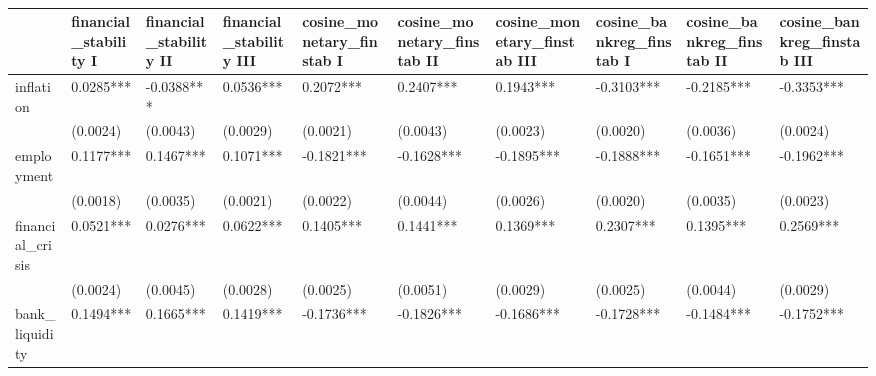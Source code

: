\begin{table}
\caption{}
\label{}
\begin{center}
\begin{tabular}{llllllllll}
\hline
                         & financial\_stability I & financial\_stability II & financial\_stability III & cosine\_monetary\_finstab I & cosine\_monetary\_finstab II & cosine\_monetary\_finstab III & cosine\_bankreg\_finstab I & cosine\_bankreg\_finstab II & cosine\_bankreg\_finstab III  \\
\hline
inflation                & 0.0285***              & -0.0388***              & 0.0536***                & 0.2072***                   & 0.2407***                    & 0.1943***                     & -0.3103***                 & -0.2185***                  & -0.3353***                    \\
                         & (0.0024)               & (0.0043)                & (0.0029)                 & (0.0021)                    & (0.0043)                     & (0.0023)                      & (0.0020)                   & (0.0036)                    & (0.0024)                      \\
employment               & 0.1177***              & 0.1467***               & 0.1071***                & -0.1821***                  & -0.1628***                   & -0.1895***                    & -0.1888***                 & -0.1651***                  & -0.1962***                    \\
                         & (0.0018)               & (0.0035)                & (0.0021)                 & (0.0022)                    & (0.0044)                     & (0.0026)                      & (0.0020)                   & (0.0035)                    & (0.0023)                      \\
financial\_crisis        & 0.0521***              & 0.0276***               & 0.0622***                & 0.1405***                   & 0.1441***                    & 0.1369***                     & 0.2307***                  & 0.1395***                   & 0.2569***                     \\
                         & (0.0024)               & (0.0045)                & (0.0028)                 & (0.0025)                    & (0.0051)                     & (0.0029)                      & (0.0025)                   & (0.0044)                    & (0.0029)                      \\
bank\_liquidity          & 0.1494***              & 0.1665***               & 0.1419***                & -0.1736***                  & -0.1826***                   & -0.1686***                    & -0.1728***                 & -0.1484***                  & -0.1752***                    \\

\end{tabular}
\end{center}
\end{table}
